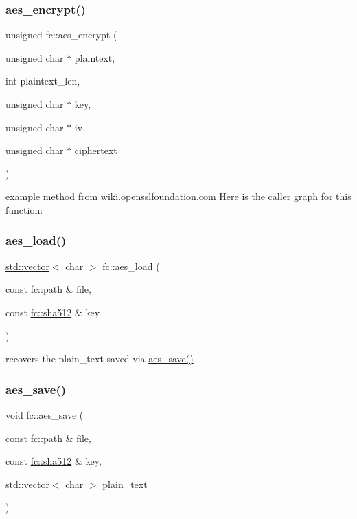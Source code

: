\subsubsection{\texorpdfstring{aes\+\_\+encrypt()}{aes\_encrypt()}}
{\footnotesize\ttfamily unsigned fc\+::aes\+\_\+encrypt (\begin{DoxyParamCaption}\item[{unsigned char $\ast$}]{plaintext,  }\item[{int}]{plaintext\+\_\+len,  }\item[{unsigned char $\ast$}]{key,  }\item[{unsigned char $\ast$}]{iv,  }\item[{unsigned char $\ast$}]{ciphertext }\end{DoxyParamCaption})}

example method from wiki.\+opensslfoundation.\+com Here is the caller graph for this function\+:
\mbox{\label{namespacefc_a971e5743b54d7c728f068af266a9e6f1}} 
\subsubsection{\texorpdfstring{aes\+\_\+load()}{aes\_load()}}
{\footnotesize\ttfamily \mbox{\hyperlink{classstd_1_1vector}{std\+::vector}}$<$ char $>$ fc\+::aes\+\_\+load (\begin{DoxyParamCaption}\item[{const \mbox{\hyperlink{classfc_1_1path}{fc\+::path}} \&}]{file,  }\item[{const \mbox{\hyperlink{classfc_1_1sha512}{fc\+::sha512}} \&}]{key }\end{DoxyParamCaption})}

recovers the plain\+\_\+text saved via \mbox{\hyperlink{namespacefc_a8373bafd21e20c371b433c3a4ea2161f}{aes\+\_\+save()}} \mbox{\label{namespacefc_a8373bafd21e20c371b433c3a4ea2161f}} 
\subsubsection{\texorpdfstring{aes\+\_\+save()}{aes\_save()}}
{\footnotesize\ttfamily void fc\+::aes\+\_\+save (\begin{DoxyParamCaption}\item[{const \mbox{\hyperlink{classfc_1_1path}{fc\+::path}} \&}]{file,  }\item[{const \mbox{\hyperlink{classfc_1_1sha512}{fc\+::sha512}} \&}]{key,  }\item[{\mbox{\hyperlink{classstd_1_1vector}{std\+::vector}}$<$ char $>$}]{plain\+\_\+text }\end{DoxyParamCaption})}

